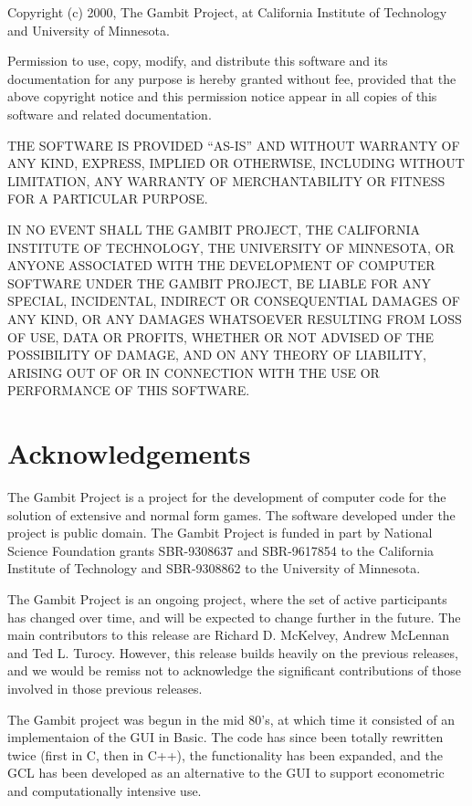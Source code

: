 Copyright (c) 2000, The Gambit Project, at California Institute of
Technology and University of Minnesota.

Permission to use, copy, modify, and distribute this software and its
documentation for any purpose is hereby granted without fee, provided
that the above copyright notice and this permission notice appear in
all copies of this software and related documentation.

THE SOFTWARE IS PROVIDED ``AS-IS'' AND WITHOUT WARRANTY OF ANY KIND,
EXPRESS, IMPLIED OR OTHERWISE, INCLUDING WITHOUT LIMITATION, ANY
WARRANTY OF MERCHANTABILITY OR FITNESS FOR A PARTICULAR PURPOSE.
 
IN NO EVENT SHALL THE GAMBIT PROJECT, THE CALIFORNIA INSTITUTE OF
TECHNOLOGY, THE UNIVERSITY OF MINNESOTA, OR ANYONE ASSOCIATED WITH THE
DEVELOPMENT OF COMPUTER SOFTWARE UNDER THE GAMBIT PROJECT, BE LIABLE
FOR ANY SPECIAL, INCIDENTAL, INDIRECT OR CONSEQUENTIAL DAMAGES OF ANY
KIND, OR ANY DAMAGES WHATSOEVER RESULTING FROM LOSS OF USE, DATA OR
PROFITS, WHETHER OR NOT ADVISED OF THE POSSIBILITY OF DAMAGE, AND ON
ANY THEORY OF LIABILITY, ARISING OUT OF OR IN CONNECTION WITH THE USE
OR PERFORMANCE OF THIS SOFTWARE.

\chapter*{Acknowledgements}
\pagestyle{myheadings}

The Gambit Project is a project for the development of computer code
for the solution of extensive and normal form games.  The software
developed under the project is public domain. The Gambit Project is
funded in part by National Science Foundation grants SBR-9308637 and
SBR-9617854 to the California Institute of Technology and SBR-9308862
to the University of Minnesota.

The Gambit Project is an ongoing project, where the set of active
participants has changed over time, and will be expected to change
further in the future.  The main contributors to this release are
Richard D. McKelvey, Andrew McLennan and Ted L. Turocy.  However, this
release builds heavily on the previous releases, and we would be
remiss not to acknowledge the significant contributions of those
involved in those previous releases.

The Gambit project was begun in the mid 80's, at which time it
consisted of an implementaion of the GUI in Basic.  The code has since
been totally rewritten twice (first in C, then in C++), the
functionality has been expanded, and the GCL has been developed as an
alternative to the GUI to support econometric and computationally
intensive use.

